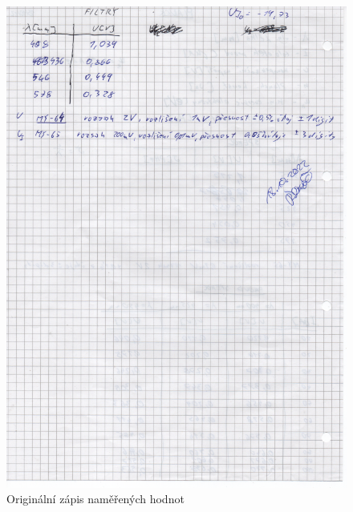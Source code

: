 \documentclass[titlepage]{article}
\begin{document}
\begin{figure}[H]
\begin{minipage}{0.4\textwidth}
  \includegraphics[width=\textwidth]{page2.png}
 \end{minipage}
 \caption{Originální zápis naměřených hodnot}
\end{figure}
\end{document}
